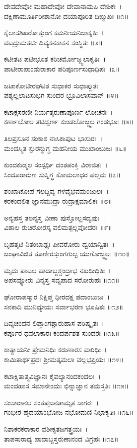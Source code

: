 	ದೇವದೇವೋ ಮಹಾದೇವೋ ದೇವಾನಾಮಪಿ ದೇಶಿಕಃ~।\\
	ದಕ್ಷಿಣಾಮೂರ್ತಿರೀಶಾನೋ ದಯಾಪೂರಿತ ದಿಙ್ಮುಖಃ ॥೧॥

ಕೈಲಾಸಶಿಖರೋತ್ತುಂಗ ಕಮನೀಯನಿಜಾಕೃತಿಃ~।\\
ವಟದ್ರುಮತಟೀ ದಿವ್ಯಕನಕಾಸನ ಸಂಸ್ಥಿತಃ ॥೨॥

	ಕಟೀತಟ ಪಟೀಭೂತ ಕರಿಚರ್ಮೋಜ್ಜ್ವಲಾಕೃತಿಃ~।\\
	ಪಾಟೀರಾಪಾಂಡುರಾಕಾರ ಪರಿಪೂರ್ಣಸುಧಾಧಿಪಃ~।೩॥

ಜಟಾಕೋಟೀರಘಟಿತ ಸುಧಾಕರ ಸುಧಾಪ್ಲುತಃ~।\\
ಪಶ್ಯಲ್ಲಲಾಟಸುಭಗ ಸುಂದರ ಭ್ರೂವಿಲಾಸವಾನ್ ॥೪॥

	ಕಟಾಕ್ಷಸರಣೀ ನಿರ್ಯತ್ಕರುಣಾಪೂರ್ಣ ಲೋಚನಃ~।\\
	ಕರ್ಣಾಲೋಲ ತಟಿದ್ವರ್ಣ ಕುಂಡಲೋಜ್ಜ್ವಲ ಗಂಡಭೂಃ ॥೫॥

ತಿಲಪ್ರಸೂನ ಸಂಕಾಶ ನಾಸಿಕಾಪುಟ ಭಾಸುರಃ~।\\
ಮಂದಸ್ಮಿತ ಸ್ಫುರನ್ಮುಗ್ಧ ಮಹನೀಯ ಮುಖಾಂಬುಜಃ ॥೬॥

	ಕುಂದಕುಡ್ಮಲ ಸಂಸ್ಪರ್ಧಿ ದಂತಪಂಕ್ತಿ ವಿರಾಜಿತಃ~।\\
	ಸಿಂದೂರಾರುಣ ಸುಸ್ನಿಗ್ಧ ಕೋಮಲಾಧರ ಪಲ್ಲವಃ ॥೭॥

ಶಂಖಾಟೋಪ ಗಲದ್ದಿವ್ಯ ಗಳವೈಭವಮಂಜುಲಃ~।\\
ಕರಕಂದಲಿತ ಜ್ಞಾನಮುದ್ರಾ ರುದ್ರಾಕ್ಷಮಾಲಿಕಃ ॥೮॥

	ಅನ್ಯಹಸ್ತ ತಲನ್ಯಸ್ತ ವೀಣಾ ಪುಸ್ತೋಲ್ಲಸದ್ವಪುಃ~।\\
	ವಿಶಾಲ ರುಚಿರೋರಸ್ಕ ವಲಿಮತ್ಪಲ್ಲವೋದರಃ ॥೯॥

ಬೃಹತ್ಕಟಿ ನಿತಂಬಾಢ್ಯಃ ಪೀವರೋರು ದ್ವಯಾನ್ವಿತಃ~।\\
ಜಂಘಾವಿಜಿತ ತೂಣೀರಸ್ತುಂಗಗುಲ್ಫ ಯುಗೋಜ್ಜ್ವಲಃ ॥೧೦॥

	ಮೃದು ಪಾಟಲ ಪಾದಾಬ್ಜಶ್ಚಂದ್ರಾಭ ನಖದೀಧಿತಿಃ~।\\
	ಅಪಸವ್ಯೋರು ವಿನ್ಯಸ್ತ ಸವ್ಯಪಾದ ಸರೋರುಹಃ ॥೧೧॥

ಘೋರಾಪಸ್ಮಾರ ನಿಕ್ಷಿಪ್ತ ಧೀರದಕ್ಷ ಪದಾಂಬುಜಃ~।\\
ಸನಕಾದಿ ಮುನಿಧ್ಯೇಯಃ ಸರ್ವಾಭರಣ ಭೂಷಿತಃ ॥೧೨॥

	ದಿವ್ಯಚಂದನ ಲಿಪ್ತಾಂಗಶ್ಚಾರುಹಾಸ ಪರಿಷ್ಕೃತಃ~।\\
	ಕರ್ಪೂರ ಧವಲಾಕಾರಃ ಕಂದರ್ಪಶತ ಸುಂದರಃ ॥೧೩॥

ಕಾತ್ಯಾಯನೀ ಪ್ರೇಮನಿಧಿಃ ಕರುಣಾರಸ ವಾರಿಧಿಃ~।\\
ಕಾಮಿತಾರ್ಥಪ್ರದಃ ಶ್ರೀಮತ್ಕಮಲಾ ವಲ್ಲಭಪ್ರಿಯಃ ॥೧೪॥

	ಕಟಾಕ್ಷಿತಾತ್ಮವಿಜ್ಞಾನಃ ಕೈವಲ್ಯಾನಂದಕಂದಲಃ~।\\
	ಮಂದಹಾಸ ಸಮಾನೇಂದುಃ ಛಿನ್ನಾಜ್ಞಾನ ತಮಸ್ತತಿಃ ॥೧೫॥

ಸಂಸಾರಾನಲ ಸಂತಪ್ತಜನತಾಮೃತ ಸಾಗರಃ~।\\
ಗಂಭೀರ ಹೃದಯಾಂಭೋಜ ನಭೋಮಣಿ ನಿಭಾಕೃತಿಃ ॥೧೬॥

	ನಿಶಾಕರಕರಾಕಾರ ವಶೀಕೃತಜಗತ್ತ್ರಯಃ~।\\
	ತಾಪಸಾರಾಧ್ಯ ಪಾದಾಬ್ಜಸ್ತರುಣಾನಂದ ವಿಗ್ರಹಃ ॥೧೭॥

